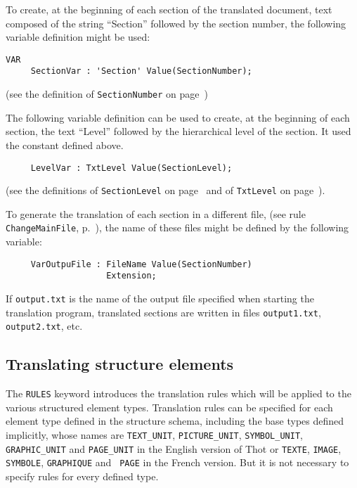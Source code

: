 \begin{example}
To create, at the beginning of each section of the translated
document, text composed of the string ``Section'' followed by the
section number, the following variable definition might be used:
\begin{verbatim}
VAR
     SectionVar : 'Section' Value(SectionNumber);
\end{verbatim}
\label{varsect}
(see the definition of {\tt SectionNumber} on page~\pageref{numsect})

The following variable definition can be used to create, at the
beginning of each section, the text ``Level'' followed by the
hierarchical level of the section.  It used the constant defined
above.
\begin{verbatim}
     LevelVar : TxtLevel Value(SectionLevel);
\end{verbatim}
(see the definitions of {\tt SectionLevel} on page~\pageref{numsect}
and of {\tt TxtLevel} on page~\pageref{txtniveau}).

To generate the translation of each section in a different file,
(see rule {\tt ChangeMainFile}, p.~\pageref{changemainfile}), the
name of these files might be defined by the following variable:
\begin{verbatim}
     VarOutpuFile : FileName Value(SectionNumber)
                    Extension;
\end{verbatim}
\label{varoutputfile}
If {\tt output.txt} is the name of the output file specified when
starting the translation program, translated sections are written
in files {\tt output1.txt}, {\tt output2.txt}, etc.
\end{example}

\subsection{Translating structure elements}

The {\tt RULES} keyword introduces the translation rules which will be
applied to the various structured element types.  Translation rules
can be specified for each element type defined in the structure
schema, including the base types defined implicitly, whose names are
{\tt TEXT\_UNIT}, {\tt PICTURE\_UNIT}, {\tt SYMBOL\_UNIT}, {\tt
GRAPHIC\_UNIT} and {\tt PAGE\_UNIT} in the English version of Thot or
{\tt TEXTE}, {\tt IMAGE}, {\tt SYMBOLE}, {\tt GRAPHIQUE} and {\tt
PAGE} in the French version.  But it is not necessary to specify rules
for every defined type.

